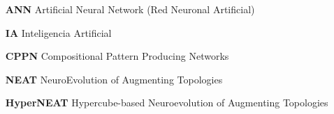 \begin{itemize}

\item[\textbf{ANN}] Artificial Neural Network (Red Neuronal Artificial)

\item[\textbf{IA}] Inteligencia Artificial

\item[\textbf{CPPN}] Compositional Pattern Producing Networks

\item[\textbf{NEAT}] NeuroEvolution of Augmenting Topologies

\item[\textbf{HyperNEAT}] Hypercube-based Neuroevolution of Augmenting Topologies

\end{itemize}